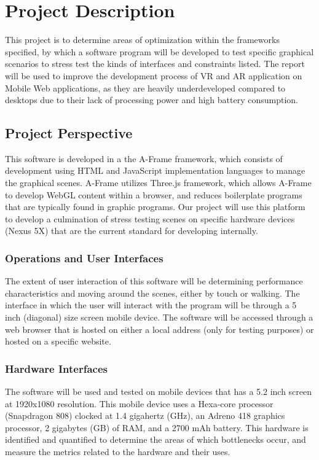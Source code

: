 \documentclass[letterpaper,10pt,titlepage,draftclsnofoot,onecolumn,compsoc,utf8,latin1]{IEEEtran}
\begin{document}
\section{Project Description}
\begin{singlespace}
\noindent
This project is to determine areas of optimization within the frameworks specified, by which a software program will be developed to test specific graphical scenarios to stress test the kinds of interfaces and constraints listed. The report will be used to improve the development process of VR and AR application on Mobile Web applications, as they are heavily underdeveloped compared to desktops due to their lack of processing power and high battery consumption.

\subsection{Project Perspective}
\begin{singlespace}
\noindent
This software is developed in a the A-Frame framework, which consists of development using HTML and JavaScript implementation languages to manage the graphical scenes. A-Frame utilizes Three.js framework, which allows A-Frame to develop WebGL content within a browser, and reduces boilerplate programs that are  typically found in graphic programs. Our project will  use this platform to develop a culmination of stress testing scenes on specific hardware devices (Nexus 5X) that are the current standard for developing internally.
\end{singlespace}

\subsubsection{Operations and User Interfaces}
\begin{singlespace}
\noindent
The extent of user interaction of this software will be determining performance characteristics and moving around the scenes, either by touch or walking. The interface in which the user will interact with the program will be through a 5 inch (diagonal) size screen mobile device. The software will be accessed through a web browser that is hosted on either a local address (only for testing purposes) or hosted on a specific website.
\end{singlespace}

\subsubsection{Hardware Interfaces}
\begin{singlespace}
\noindent
The software will be used and tested on mobile devices that has a 5.2 inch screen at 1920x1080 resolution. This mobile device uses a Hexa-core processor (Snapdragon 808) clocked at 1.4 gigahertz (GHz), an Adreno 418 graphics processor, 2 gigabytes (GB) of RAM, and a 2700 mAh battery. This hardware is identified and quantified to determine the areas of which bottlenecks occur, and measure the metrics related to the hardware and their uses.
\end{singlespace}


\end{singlespace}
\end{document}
